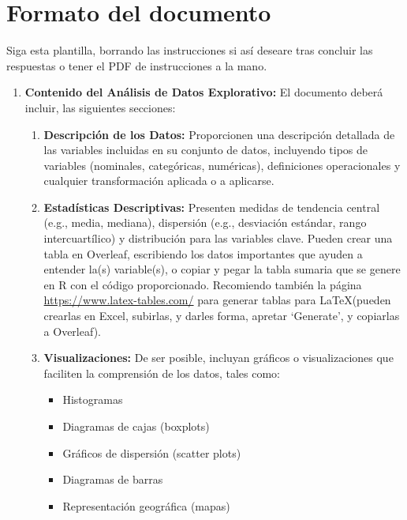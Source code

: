 \documentclass[11pt]{article}
\begin{document}
\section*{Formato del documento}
Siga esta plantilla, borrando las instrucciones si así deseare tras concluir las respuestas o tener el PDF de instrucciones a la mano. 
\begin{enumerate}
\begin{itemize}
    \item \textbf{Portada:} Sigan las instrucciones y formato anteriormente mencionados. 
    \item \textbf{Espaciado:} Mantengan espaciado de 1.5 líneas (\texttt{\textbackslash onehalfspacing}).
    \item \textbf{Fuentes y estilos:} Sigan las directrices de formato establecidas en la plantilla de \LaTeX proporcionada.
\end{itemize}

\item \textbf{Contenido del Análisis de Datos Explorativo:} El documento deberá incluir, las siguientes secciones:
\begin{enumerate}
    \item \textbf{Descripción de los Datos:} Proporcionen una descripción detallada de las variables incluidas en su conjunto de datos, incluyendo tipos de variables (nominales, categóricas, numéricas), definiciones operacionales y cualquier transformación aplicada o a aplicarse.

    \item \textbf{Estadísticas Descriptivas:} Presenten medidas de tendencia central (e.g., media, mediana), dispersión (e.g., desviación estándar, rango intercuartílico) y distribución para las variables clave. Pueden crear una tabla en Overleaf, escribiendo los datos importantes que ayuden a entender la(s) variable(s), o copiar y pegar la tabla sumaria que se genere en R con el código proporcionado. Recomiendo también la página \url{https://www.latex-tables.com/} para generar tablas para \LaTeX (pueden crearlas en Excel, subirlas, y darles forma, apretar `Generate', y copiarlas a Overleaf).

    \item \textbf{Visualizaciones:} De ser posible, incluyan gráficos o visualizaciones que faciliten la comprensión de los datos, tales como:
    \begin{itemize}
        \item Histogramas
        \item Diagramas de cajas (boxplots)
        \item Gráficos de dispersión (scatter plots)
        \item Diagramas de barras
        \item Representación geográfica (mapas)
    \end{itemize}


\end{enumerate}
\end{enumerate}
\end{document}
